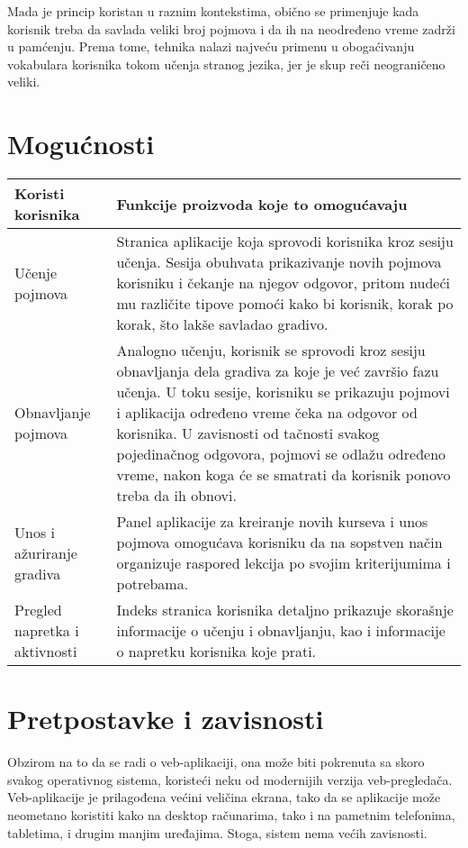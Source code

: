 Mada je princip koristan u raznim kontekstima, obično se primenjuje kada korisnik treba da savlada veliki broj pojmova i da ih na neodređeno vreme zadrži u pamćenju.
Prema tome, tehnika nalazi najveću primenu u obogaćivanju vokabulara korisnika tokom učenja stranog jezika, jer je skup reči neograničeno veliki.

\section{Mogućnosti}

\begin{center}
    \begin{tabular}{|m{3cm}|m{7cm}|}
        \hline
        Koristi korisnika &
        Funkcije proizvoda koje to omogućavaju\\
        \hline
        Učenje pojmova &
        Stranica aplikacije koja sprovodi korisnika kroz sesiju učenja. Sesija obuhvata prikazivanje novih pojmova korisniku i čekanje na njegov odgovor, pritom nudeći mu različite tipove pomoći kako bi korisnik, korak po korak, što lakše savladao gradivo.\\
        \hline
        Obnavljanje pojmova &
        Analogno učenju, korisnik se sprovodi kroz sesiju obnavljanja dela gradiva za koje je već završio fazu učenja. U toku sesije, korisniku se prikazuju pojmovi i aplikacija određeno vreme čeka na odgovor od korisnika. U zavisnosti od tačnosti svakog pojedinačnog odgovora, pojmovi se odlažu određeno vreme, nakon koga će se smatrati da korisnik ponovo treba da ih obnovi.\\
        \hline
        Unos i ažuriranje gradiva &
        Panel aplikacije za kreiranje novih kurseva i unos pojmova omogućava korisniku da na sopstven način organizuje raspored lekcija po svojim kriterijumima i potrebama.\\
        \hline
        Pregled napretka i aktivnosti &
        Indeks stranica korisnika detaljno prikazuje skorašnje informacije o učenju i obnavljanju, kao i informacije o napretku korisnika koje prati.
        \\
        \hline
    \end{tabular}
\end{center}

\section{Pretpostavke i zavisnosti}
Obzirom na to da se radi o veb-aplikaciji, ona može biti pokrenuta sa skoro svakog operativnog sistema, koristeći neku od modernijih verzija veb-pregledača.
Veb-aplikacije je prilagođena većini veličina ekrana, tako da se aplikacije može neometano koristiti kako na desktop računarima, tako i na pametnim telefonima, tabletima, i drugim manjim uređajima.
Stoga, sistem nema većih zavisnosti.

